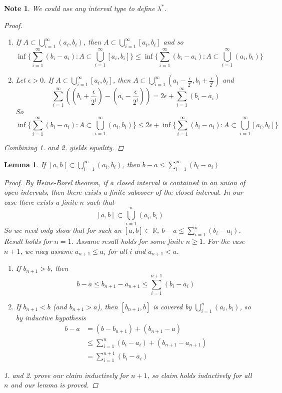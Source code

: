 \documentclass[12pt]{article}
\newtheorem{lemma}[theorem]{Lemma}
\newtheorem*{note}{Note}
\begin{document}
\begin{note}
	We could use any interval type to define $\lambda^*$.
	\begin{proof}
		\begin{enumerate}
			\item If $A \subset \bigcup_{i=1}^\infty (a_i, b_i)$, then $A \subset \bigcup_{i=1}^\infty [a_i, b_i]$ and so
			$$\inf\{\sum_{i=1}^\infty(b_i - a_i) : A \subset \bigcup_{i=1}^\infty[a_i,b_i]\} \le \inf\{\sum_{i=1}^\infty(b_i - a_i) : A \subset \bigcup_{i=1}^\infty(a_i,b_i)\}$$
			\item Let $\epsilon > 0$.  If $A \subset \bigcup_{i=1}^\infty [a_i, b_i]$, then $A \subset \bigcup_{i=1}^\infty (a_i - \frac{\epsilon}{2^i}, b_i + \frac{\epsilon}{2^i})$ and
			$$\sum_{i=1}^\infty ((b_i + \frac{\epsilon}{2^i}) - (a_i - \frac{\epsilon}{2^i})) = 2\epsilon + \sum_{i=1}^\infty (b_i - a_i)$$
			So
			$$\inf\{\sum_{i=1}^\infty(b_i - a_i) : A \subset \bigcup_{i=1}^\infty (a_i, b_i)\} \le 2\epsilon + \inf\{\sum_{i=1}^\infty(b_i - a_i) : A \subset \bigcup_{i=1}^\infty [a_i, b_i]\} $$
		\end{enumerate}
		Combining 1. and 2. yields equality.
	\end{proof}
\end{note}

\begin{lemma} \label{L:leb-a}
	If $[a,b] \subset \bigcup_{i=1}^\infty(a_i,b_i)$, then $b - a \le \sum_{i=1}^\infty (b_i - a_i)$
	\begin{proof}
		By Heine-Borel theorem, if a closed interval is contained in an union of open intervals, then there exists a finite subcover of the closed interval.  In our case there exists a finite $n$ such that
		$$[a,b] \subset \bigcup_{i=1}^n (a_i, b_i)$$
		So we need only show that for such an $[a,b] \subset \mathbb{R}$, $b - a \le \sum_{i=1}^n (b_i - a_i)$.\\
		Result holds for $n=1$. Assume result holds for some finite $n \ge 1$. For the case $n + 1$, we may assume $a_{n+1} \le a_i$ for all $i$ and $a_{n+1} < a$.\\
		\begin{enumerate}
			\item If $b_{n+1} > b$, then
			$$b - a \le b_{n+1} - a_{n+1} \le \sum_{i=1}^{n+1} (b_i - a_i)$$
			\item If $b_{n+1} < b$ (and $b_{n+1} > a$), then $[b_{n+1}, b]$ is covered by $\bigcup_{i=1}^n (a_i, b_i)$, so by inductive hypothesis
			\begin{align*}
				b - a &= (b - b_{n+1}) + (b_{n+1} - a)\\
				&\le \sum_{i=1}^n (b_i - a_i) + (b_{n+1} - a_{n+1})\\
				&= \sum_{i=1}^{n+1} (b_i - a_i)
			\end{align*}
		\end{enumerate}
		1. and 2. prove our claim inductively for $n+1$, so claim holds inductively for all $n$ and our lemma is proved.
	\end{proof}
\end{lemma}
\end{document}
